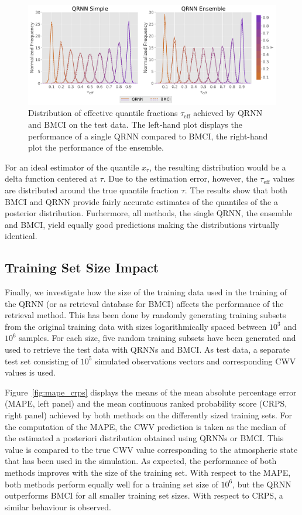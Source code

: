 \documentclass[journal abbreviation, manuscript]{copernicus}
\begin{document}
  \begin{figure}[hbpt!]
    \centering
    \includegraphics[width = 0.8\linewidth]{../plots/quantile_fractions}
    \caption{Distribution of effective quantile fractions $\tau_\text{eff}$ achieved by
      QRNN and BMCI on the test data. The left-hand plot displays the performance of a
      single QRNN compared to BMCI, the right-hand plot the performance of the ensemble.}
    \label{fig:quantile_fractions}
  \end{figure}

  For an ideal estimator of the quantile $x_\tau$, the resulting distribution
  would be a delta function centered at $\tau$. Due to the estimation error,
  however, the $\tau_{\text{eff}}$ values are distributed around the true quantile
  fraction $\tau$. The results show that both BMCI and QRNN provide fairly
  accurate estimates of the quantiles of the a posterior distribution. Furhermore,
  all methods, the single QRNN, the ensemble and BMCI, yield equally good predictions
  making the distributions virtually identical.

\subsection{Training Set Size Impact}

Finally, we investigate how the size of the training data used in the training
of the QRNN (or as retrieval database for BMCI) affects the performance of the
retrieval method. This has been done by randomly generating training subsets
from the original training data with sizes logarithmically spaced between $10^3$
and $10^6$ samples. For each size, five random training subsets have been
generated and used to retrieve the test data with QRNNs and BMCI. As test data,
a separate test set consisting of $10^5$ simulated observations vectors and
corresponding CWV values is used.

Figure~\ref{fig:mape_crps} displays the means of the mean absolute percentage
error (MAPE, left panel) and the mean continuous ranked probability score (CRPS,
right panel) achieved by both methods on the differently sized training sets.
For the computation of the MAPE, the CWV prediction is taken as the median of
the estimated a posteriori distribution obtained using QRNNs or BMCI. This value
is compared to the true CWV value corresponding to the atmospheric state that
has been used in the simulation. As expected, the performance of both methods
improves with the size of the training set. With respect to the MAPE, both
methods perform equally well for a training set size of $10^6$, but the QRNN
outperforms BMCI for all smaller training set sizes. With respect to CRPS, a
similar behaviour is observed.
\end{document}
